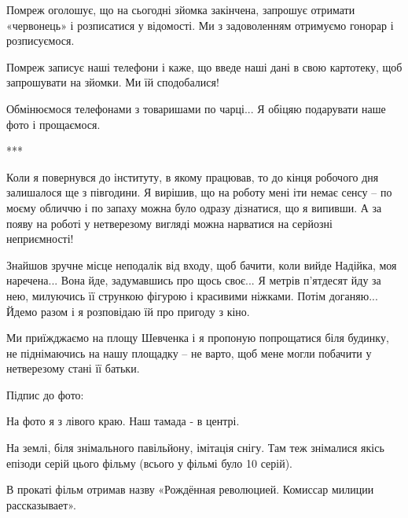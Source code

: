 Помреж оголошує, що на сьогодні зйомка закінчена, запрошує отримати «червонець»
і розписатися у відомості. Ми з задоволенням отримуємо гонорар і розписуємося. 

Помреж записує наші телефони і каже, що введе наші дані в свою картотеку, щоб
запрошувати на зйомки. Ми їй сподобалися!

Обмінюємося телефонами з товаришами по чарці... Я обіцяю подарувати наше фото і
прощаємося. 

***

Коли я повернувся до інституту, в якому працював, то до кінця робочого дня
залишалося ще з півгодини. Я вирішив, що на роботу мені іти немає сенсу – по
моєму обличчю і по запаху можна було одразу дізнатися, що я випивши. А за появу
на роботі у нетверезому вигляді можна нарватися на серйозні неприємності! 

Знайшов зручне місце неподалік від входу, щоб бачити, коли вийде Надійка, моя
наречена... Вона йде, задумавшись про щось своє... Я метрів п’ятдесят йду за нею,
милуючись її стрункою фігурою і красивими ніжками. Потім доганяю... Йдемо разом і
я розповідаю їй про пригоду з кіно. 

Ми приїжджаємо на площу Шевченка і я пропоную попрощатися біля будинку, не
піднімаючись на нашу площадку – не варто, щоб мене могли побачити у нетверезому
стані її батьки.

Підпис до фото:

На фото я з лівого краю. Наш тамада - в центрі.

На землі, біля знімального павільйону, імітація снігу. Там теж знімалися якісь
епізоди серій цього фільму (всього у фільмі було 10 серій).

В прокаті фільм отримав назву «Рождённая революцией. Комиссар милиции
рассказывает».

